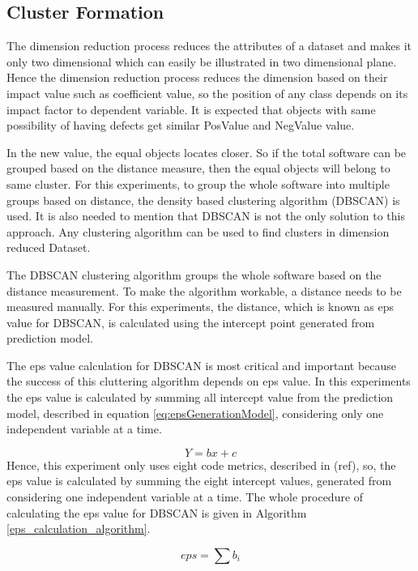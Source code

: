\documentclass[12pt]{report}
\begin{document}
\subsection{Cluster Formation}

The dimension reduction process reduces the attributes of a dataset and makes it only two dimensional which can easily be illustrated in two dimensional plane. Hence the dimension reduction process reduces the dimension based on their impact value such as coefficient value, so the position of any class depends on its impact factor to dependent variable. It is expected that objects with same possibility of having defects get similar PosValue and NegValue value.
 
In the new value, the equal objects locates closer. So if the total software can be grouped based on the distance measure, then the equal objects will belong to same cluster. For this experiments, to group the whole software into multiple groups based on distance, the density based clustering algorithm (DBSCAN) is used. It is also needed to mention that DBSCAN is not the only solution to this approach. Any clustering algorithm can be used to find clusters in dimension reduced Dataset.
 
The DBSCAN clustering algorithm groups the whole software based on the distance measurement. To make the algorithm workable, a distance needs to be measured manually. For this experiments, the distance, which is known as eps value for DBSCAN, is calculated using the intercept point generated from prediction model.

The eps value calculation for DBSCAN is most critical and important because the success of this cluttering algorithm depends on eps value. In this experiments the eps value is calculated by summing all intercept value from the prediction model, described in equation \ref{eq:epsGenerationModel}, considering only one independent variable at a time. 

\begin{equation}
\label{eq:epsGenerationModel}
 Y=bx+c
\end{equation}
Hence, this experiment only uses eight code metrics, described in (ref{}), so, the eps value is calculated by summing the eight intercept values, generated from considering one independent variable at a time.  
The whole procedure of calculating the eps value for DBSCAN is given in Algorithm \ref{eps_calculation_algorithm}. 

\begin{equation}
\label{eq:totalepsCalculation}
 eps=\sum{b_{i}}
\end{equation}
\end{document}
